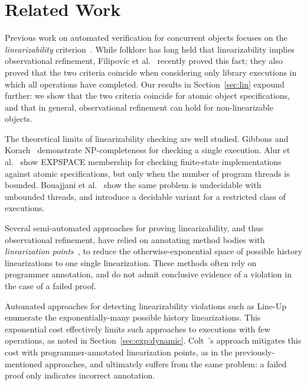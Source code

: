 \section{Related Work}
\label{sec:related}


Previous work on automated verification for concurrent objects focuses on the
\emph{linearizability} criterion~\citep{journals/toplas/HerlihyW90}. While
folklore has long held that linearizability implies observational refinement,
Filipovic et al.~\cite{journals/tcs/FilipovicORY10} recently proved this fact;
they also proved that the two criteria coincide when considering only library
executions in which all operations have completed. Our results in
Section~\ref{sec:lin} expound further: we show that the two criteria coincide
for atomic object specifications, and that in general, observational refinement
can hold for non-linearizable objects.

The theoretical limits of linearizability checking are well studied. Gibbons
and Korach~\cite{journals/siamcomp/GibbonsK97} demonstrate NP-completeness for
checking a single execution. Alur et al.~\cite{journals/iandc/AlurMP00} show
EXPSPACE membership for checking finite-state implementations against atomic
specifications, but only when the number of program threads is bounded.
Bouajjani et al.~\cite{conf/esop/BouajjaniEEH13} show the same problem is
undecidable with unbounded threads, and introduce a decidable variant for a
restricted class of executions.


Several semi-automated approaches for proving linearizability, and thus
observational refinement, have relied on annotating method bodies with
\emph{linearization points}~\cite{conf/cav/AmitRRSY07, conf/fm/LiuCLS09,
conf/podc/OHearnRVYY10, conf/cav/Vafeiadis10, conf/icse/Zhang11a,
conf/pldi/LiangF13, conf/cav/DragoiGH13}, to reduce the otherwise-exponential
space of possible history linearizations to one single linearization. These
methods often rely on programmer annotation, and do not admit conclusive
evidence of a violation in the case of a failed proof.

Automated approaches for detecting linearizability violations such as
Line-Up~\cite{conf/pldi/BurckhardtDMT10} enumerate the exponentially-many
possible history linearizations. This exponential cost effectively limits such
approaches to executions with few operations, as noted in
Section~\ref{sec:exp:dynamic}. Colt~\cite{conf/oopsla/ShachamBASVY11}'s
approach mitigates this cost with programmer-annotated linearization points, as
in the previously-mentioned approaches, and ultimately suffers from the same
problem: a failed proof only indicates incorrect annotation.
